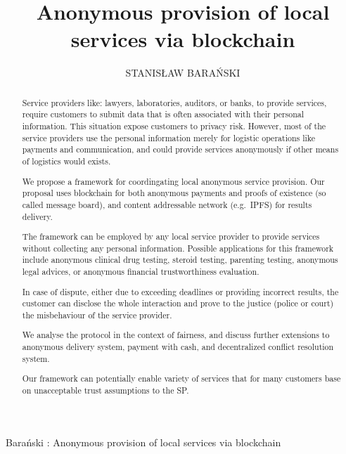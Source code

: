 \documentclass{ieeeaccess}
\begin{document}

\title{Anonymous provision of local services via blockchain}
\author{\uppercase{Stanis\l{}aw Bara{\'n}ski}}

\address[1]{Department of Electronic, Telecommunication and Informatics, Gdansk University of Technology, Narutowicza 11/12 Gdansk Poland (e-mail: stanislaw.baranski@pg.edu.pl}


{Bara{\'n}ski : 
Anonymous provision of local services via blockchain}


\begin{abstract}
Service providers like: lawyers, laboratories, auditors, or banks, to
provide services, require customers to submit data that is often
associated with their personal information. This situation expose
customers to privacy risk. However, most of the service providers use
the personal information merely for logistic operations like payments
and communication, and could provide services anonymously if other means
of logistics would exists.

We propose a framework for coordingating local anonymous service
provision. Our proposal uses blockchain for both anonymous payments and
proofs of existence (so called message board), and content addressable
network (e.g.~IPFS) for results delivery.

The framework can be employed by any local service provider to provide
services without collecting any personal information. Possible
applications for this framework include anonymous clinical drug testing,
steroid testing, parenting testing, anonymous legal advices, or
anonymous financial trustworthiness evaluation.

In case of dispute, either due to exceeding deadlines or providing
incorrect results, the customer can disclose the whole interaction and
prove to the justice (police or court) the misbehaviour of the service
provider.

We analyse the protocol in the context of fairness, and discuss further
extensions to anonymous delivery system, payment with cash, and
decentralized conflict resolution system.

Our framework can potentially enable variety of services that for many
customers base on unacceptable trust assumptions to the SP.
\end{abstract}
\end{document}
